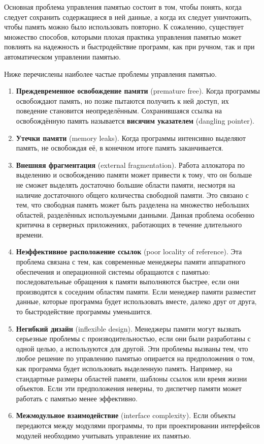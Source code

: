 Основная проблема управления памятью состоит в том, чтобы понять, когда следует сохранить содержащиеся в ней данные, а когда их следует уничтожить, чтобы память можно было использовать повторно. К сожалению, существует множество способов, которыми плохая практика управления памятью может повлиять на надежность и быстродействие программ, как при ручном, так и при автоматическом управлении памятью.

Ниже перечислены наиболее частые проблемы управления памятью. \cite{mm_overview}

\begin{enumerate}[label*=\arabic*.]
	\item \textbf{Преждевременное освобождение памяти} (premature free). 
	Когда программы освобождают память, но позже пытаются получить к ней доступ, их поведение становится неопределённым. Сохранившаяся ссылка на освобождённую память называется \textbf{висячим указателем} (dangling pointer).
	\item \textbf{Утечки памяти} (memory leaks). Когда программы интенсивно выделяют память, не освобождая её, в конечном итоге память заканчивается.
	\item \textbf{Внешняя фрагментация} (external fragmentation). Работа аллокатора по выделению и освобождению памяти может привести к тому, что он больше не сможет выделять достаточно большие области памяти, несмотря на наличие достаточного общего количества свободной памяти. Это связано с тем, что свободная память может быть разделена на множество небольших областей, разделённых используемыми данными. Данная проблема особенно критична в серверных приложениях, работающих в течение длительного времени.
	\item \textbf{Неэффективное расположение ссылок} (poor locality of reference). Эта проблема связана с тем, как современные менеджеры памяти аппаратного обеспечения и операционной системы обращаются с памятью: последовательные обращения к памяти выполняются быстрее, если они производятся к соседним областям памяти. Если менеджер памяти разместит данные, которые программа будет использовать вместе, далеко друг от друга, то быстродействие программы уменьшится.
	\item \textbf{Негибкий дизайн} (inflexible design). Менеджеры памяти могут вызвать серьезные проблемы с производительностью, если они были разработаны с одной целью, а используются для другой. Эти проблемы вызваны тем, что любое решение по управлению памятью опирается на предположения о том, как программа будет использовать выделенную память. Например, на стандартные размеры областей памяти, шаблоны ссылок или время жизни объектов. Если эти предположения неверны, то диспетчер памяти может работать с памятью менее эффективно.
	\item \textbf{Межмодульное взаимодействие} (interface complexity). Если объекты передаются между модулями программы, то при проектировании интерфейсов модулей необходимо учитывать управление их памятью.
\end{enumerate}

